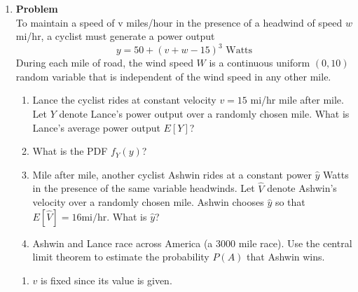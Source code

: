 \documentclass[12pt]{article}
\newenvironment{Ex}{\textbf{Problem}\vspace{.75em}\\}{}
\begin{document}
\begin{enumerate}
\begin{Ex}
\begin{solution}
\begin{enumerate}
\begin{equation}
\begin{aligned}
          \end{aligned}
        \end{equation}
        Where $\delta$ is the deviation from the mean. So the upper
        bound on the number of people which can be seated with
        confidence 0.9 is
        \begin{equation}
          \label{eq:3a-presol}
          \implies (\mu+\delta)n = 315.696
        \end{equation}
      \end{enumerate}
    \end{solution}
  \end{Ex}

\item
  \begin{Ex}
    To maintain a speed of v miles/hour in the presence of a headwind
    of speed $w$ mi/hr, a cyclist must generate a power output
    \begin{equation}
      \label{eq:4-power}
      y = 50 + (v + w - 15)^3 \text{ Watts}
    \end{equation}
    During each mile of road, the wind speed
    $W$ is a continuous uniform $(0,10)$ random variable that is
    independent of the wind speed in any other mile.
    \begin{enumerate}
    \item Lance the cyclist rides at constant velocity $v = 15$ mi/hr
      mile after mile. Let $Y$ denote Lance's power output over a
      randomly chosen mile. What is Lance's average power output
      $E[Y]$?
    \item What is the PDF $f_Y (y)$?
    \item Mile after mile, another cyclist Ashwin rides at a constant
      power $\hat{y}$ Watts in the presence of the same variable
      headwinds. Let $\hat{V}$ denote Ashwin's velocity over a
      randomly chosen mile. Ashwin chooses $\hat{y}$ so that
      $E[\hat{V}] = 16 \text{mi/hr}$. What is $\hat{y}$?
    \item Ashwin and Lance race across America (a 3000 mile race). Use
      the central limit theorem to estimate the probability $P(A)$
      that Ashwin wins.
    \end{enumerate}
    \begin{solution} \hfill
      \begin{enumerate}
      \item $v$ is fixed since its value is given.
        \begin{equation}
          \label{eq:4a-presol}

\end{equation}
\end{enumerate}
\end{solution}
\end{Ex}
\end{enumerate}
\end{document}
